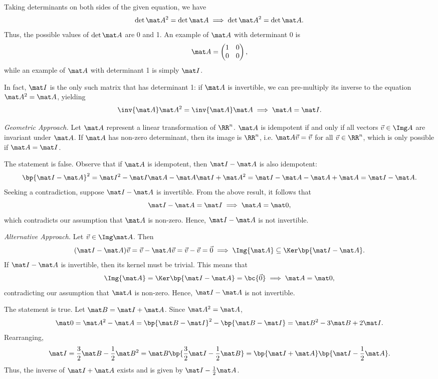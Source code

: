 \begin{solution}
    \begin{ppart}
        Taking determinants on both sides of the given equation, we have \[\det{\mat A^2} = \det{\mat A} \implies \det{\mat A}^2 = \det{\mat A}.\] Thus, the possible values of $\det{\mat A}$ are 0 and 1. An example of $\mat A$ with determinant 0 is \[\mat A = \begin{pmatrix}1 & 0 \\ 0 & 0\end{pmatrix},\] while an example of $\mat A$ with determinant 1 is simply $\mat I$.

        In fact, $\mat I$ is the only such matrix that has determinant 1: if $\mat A$ is invertible, we can pre-multiply its inverse to the equation $\mat A^2 = \mat A$, yielding \[\inv{\mat A} \mat A^2 = \inv{\mat A} \mat A \implies \mat A = \mat I.\]
        
        \noindent\textit{Geometric Approach.} Let $\mat A$ represent a linear transformation of $\RR^n$. $\mat A$ is idempotent if and only if all vectors $\vec v \in \Img A$ are invariant under $\mat A$. If $\mat A$ has non-zero determinant, then its image is $\RR^n$, i.e. $\mat A \vec v = \vec v$ for all $\vec v \in \RR^n$, which is only possible if $\mat A = \mat I$.

        \begin{psubpart}
            The statement is false. Observe that if $\mat A$ is idempotent, then $\mat I - \mat A$ is also idempotent: \[\bp{\mat I - \mat A}^2 = \mat I^2 - \mat I \mat A - \mat A \mat I + \mat A^2 = \mat I - \mat A - \mat A + \mat A = \mat I - \mat A.\] Seeking a contradiction, suppose $\mat I - \mat A$ is invertible. From the above result, it follows that \[\mat I - \mat A = \mat I \implies \mat A = \mat 0,\] which contradicts our assumption that $\mat A$ is non-zero. Hence, $\mat I - \mat A$ is not invertible.

            \noindent\textit{Alternative Approach.} Let $\vec v \in \Img \mat A$. Then \[(\mat I - \mat A) \vec v = \vec v - \mat A \vec v = \vec v - \vec v = \vec 0 \implies \Img{\mat A} \subseteq \Ker \bp{\mat I - \mat A}.\] If $\mat I - \mat A$ is invertible, then its kernel must be trivial. This means that \[\Img{\mat A} = \Ker \bp{\mat I - \mat A} = \bc{\vec 0} \implies \mat A = \mat 0,\] contradicting our assumption that $\mat A$ is non-zero. Hence, $\mat I - \mat A$ is not invertible.
        \end{psubpart}
        \begin{psubpart}
            The statement is true. Let $\mat B = \mat I + \mat A$. Since $\mat A^2 = \mat A$, \[\mat 0 = \mat A^2 - \mat A = \bp{\mat B - \mat I}^2 - \bp{\mat B - \mat I} = \mat B^2 - 3\mat B + 2 \mat I.\] Rearranging, \[\mat I = \frac32 \mat B - \frac12 \mat B^2 = \mat B \bp{\frac32 \mat I - \frac12 \mat B} = \bp{\mat I + \mat A} \bp{\mat I - \frac12 \mat A}.\] Thus, the inverse of $\mat I + \mat A$ exists and is given by $\mat I - \frac12 \mat A$.
            

\end{psubpart}
\end{ppart}
\end{solution}
